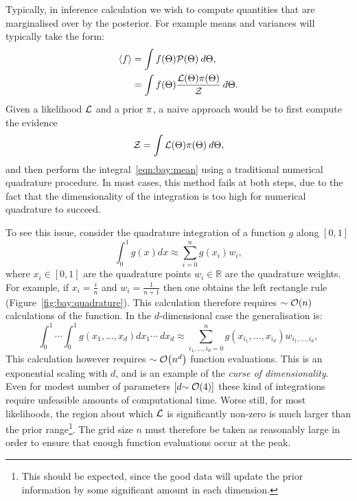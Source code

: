 Typically, in inference calculation we wish to compute quantities that are marginalised over by the posterior. For example means and variances will typically take the form:
\begin{align}
  {\left\langle{f}\right\rangle} 
  &= \int f(\Theta)\mathcal{P}(\Theta)\:d\Theta,
  \label{eqn:bay:mean}\\
  &= \int f(\Theta)\frac{\mathcal{L}(\Theta)\pi(\Theta)}{\mathcal{Z}}\:d\Theta.
\end{align}
Given a likelihood $\mathcal{L}$ and a prior $\pi$, a naive approach would be to first compute the evidence
\begin{equation}
  \mathcal{Z} = \int \mathcal{L}(\Theta) \pi(\Theta) \: d\Theta,
  \label{eqn:bay:ev_short}
\end{equation}
and then perform the integral~\eqref{eqn:bay:mean} using a traditional numerical quadrature procedure. In most cases, this method fails at both steps, due to the fact that the dimensionality of the integration is too high for numerical quadrature to succeed.

To see this issue, consider the quadrature integration of a function $g$ along $[0,1]$
\begin{equation}
  \int_0^1 g(x) dx \approx \sum\limits_{i=0}^{n} g(x_i) w_i,
  \label{eqn:bay:quadrature_1d}
\end{equation}
where ${x_i\in[0,1]}$ are the quadrature points ${w_i\in\mathbb{R}}$ are the quadrature weights. For example, if $x_i = \frac{i}{n}$ and $w_i=\frac{1}{n+1}$ then one obtains the left rectangle rule (Figure~\ref{fig:bay:quadrature}). This calculation therefore requires ${\sim\mathcal{O}{\left(n\right)}}$ calculations of the function. In the $d$-dimensional case the generalisation is:
\begin{equation}
  \int_0^1\cdots\int_0^1 g(x_1,\ldots,x_d) dx_1\cdots \: dx_d \approx \sum\limits_{i_1,\ldots,i_d=0}^{n} g(x_{i_1},\ldots,x_{i_d}) w_{i_1,\ldots,i_d},
  \label{eqn:bay:quadrature_nd}
\end{equation}
This calculation however requires ${\sim\mathcal{O}{\left(n^d\right)}}$ function evaluations. This is an exponential scaling with $d$, and is an example of the {\em curse of dimensionality}. Even for modest number of parameters $\left[ d{\sim\mathcal{O}{\left(4\right)}} \right]$ these kind of integrations require unfeasible amounts of computational time. Worse still, for most likelihoods, the region about which $\mathcal{L}$ is significantly non-zero is much larger than the prior range\footnote{This should be expected, since the good data will update the prior information by some significant amount in each dimension.}. The grid size $n$ must therefore be taken as reasonably large in order to ensure that enough function evaluations occur at the peak.

